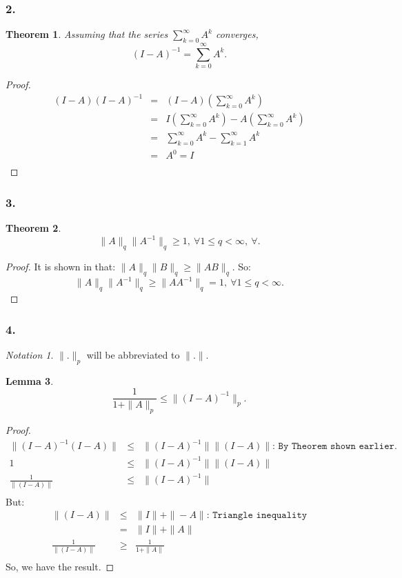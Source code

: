 \documentclass[10pt]{amsart}
\newtheorem{thm}{Theorem}[subsection]
\newtheorem{lem}[thm]{Lemma}
\theoremstyle{remark}
\newtheorem*{notation}{Notation}
\begin{document}
\subsubsection{2.}
\begin{thm}
Assuming that the series $\sum_{k=0}^{\infty}A^k$ converges, 
$$(I-A)^{-1}=\sum_{k=0}^{\infty}A^k.$$
\end{thm}
\begin{proof}
\begin{eqnarray*}
(I-A)(I-A)^{-1} &=& (I-A)(\sum_{k=0}^{\infty}A^k)\\
&=& I(\sum_{k=0}^{\infty}A^k) - A(\sum_{k=0}^{\infty}A^k)\\
&=& \sum_{k=0}^{\infty}A^k - \sum_{k=1}^{\infty}A^k\\
&=& A^0 = I\\
\end{eqnarray*} 
\end{proof}

\subsubsection{3.}
\begin{thm}
$$\|A\|_q\|A^{-1}\|_q\geq 1, \ \forall 1\leq q < \infty, \ \forall.$$
\end{thm}
\begin{proof}
It is shown in \cite{trefbau} that: $\|A\|_q\|B\|_q \geq \|AB\|_q$.
So:
$$\|A\|_q\|A^{-1}\|_q \geq \|AA^{-1}\|_q = 1, \ \forall 1\leq q < \infty.$$
\end{proof}

\subsubsection{4.}
\begin{notation}
$\|.\|_{p}$ will be abbreviated to $\|.\|$.
\end{notation}

\begin{lem}
$$\frac{1}{1+\|A\|_p}\leq \|(I-A)^{-1}\|_p .$$
\end{lem}
\begin{proof}
\begin{eqnarray*}
\|(I-A)^{-1} (I-A)\| &\leq& \|(I-A)^{-1} \|\|(I-A)\| \texttt{: By Theorem shown earlier.}\\
1 &\leq& \|(I-A)^{-1} \|\|(I-A)\|\\
\frac{1}{\|(I-A)\|} &\leq& \|(I-A)^{-1} \|\\
\end{eqnarray*} 
But:
\begin{eqnarray*}
\|(I-A)\| &\leq& \|I\| + \|-A\| \texttt{: Triangle inequality}\\
&=& \|I\| + \|A\|\\ 
\frac{1}{\|(I-A)\|} &\geq& \frac{1}{1+\|A\|}\\
\end{eqnarray*}
So, we have the result.
\end{proof}
\end{document}
